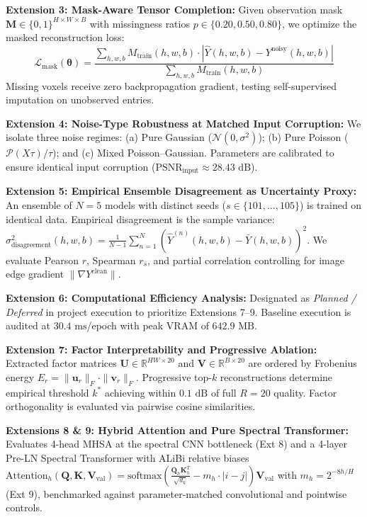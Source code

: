 \textbf{Extension 3: Mask-Aware Tensor Completion:} Given observation mask $\mathbf{M} \in \{0, 1\}^{H \times W \times B}$ with missingness ratios $p \in \{0.20, 0.50, 0.80\}$, we optimize the masked reconstruction loss:
\begin{equation}
\label{eq:masked_loss}
\mathcal{L}_\text{mask}(\boldsymbol{\theta}) = \frac{\sum_{h, w, b} M_\text{train}(h, w, b) \cdot |\hat{Y}(h, w, b) - Y^\text{noisy}(h, w, b)|}{\sum_{h, w, b} M_\text{train}(h, w, b)}
\end{equation}
Missing voxels receive zero backpropagation gradient, testing self-supervised imputation on unobserved entries.

\textbf{Extension 4: Noise-Type Robustness at Matched Input Corruption:} We isolate three noise regimes: (a) Pure Gaussian ($\mathcal{N}(0, \sigma^2)$); (b) Pure Poisson ($\mathcal{P}(X \tau)/\tau$); and (c) Mixed Poisson--Gaussian. Parameters are calibrated to ensure identical input corruption ($\text{PSNR}_\text{input} \approx 28.43\text{ dB}$).

\textbf{Extension 5: Empirical Ensemble Disagreement as Uncertainty Proxy:} An ensemble of $N=5$ models with distinct seeds ($s \in \{101, \dots, 105\}$) is trained on identical data. Empirical disagreement is the sample variance: $\sigma_\text{disagreement}^2(h, w, b) = \frac{1}{N-1} \sum_{n=1}^N (\hat{Y}^{(n)}(h, w, b) - \bar{Y}(h, w, b))^2$. We evaluate Pearson $r$, Spearman $r_s$, and partial correlation controlling for image edge gradient $\|\nabla Y^\text{clean}\|$.

\textbf{Extension 6: Computational Efficiency Analysis:} Designated as \textit{Planned / Deferred} in project execution to prioritize Extensions 7--9. Baseline execution is audited at $30.4\text{ ms}$/epoch with peak VRAM of $642.9\text{ MB}$.

\textbf{Extension 7: Factor Interpretability and Progressive Ablation:} Extracted factor matrices $\mathbf{U} \in \mathbb{R}^{HW \times 20}$ and $\mathbf{V} \in \mathbb{R}^{B \times 20}$ are ordered by Frobenius energy $E_r = \|\mathbf{u}_r\|_F \cdot \|\mathbf{v}_r\|_F$. Progressive top-$k$ reconstructions determine empirical threshold $k^*$ achieving within $0.1\text{ dB}$ of full $R=20$ quality. Factor orthogonality is evaluated via pairwise cosine similarities.

\textbf{Extensions 8 \& 9: Hybrid Attention and Pure Spectral Transformer:} Evaluates 4-head MHSA at the spectral CNN bottleneck (Ext 8) and a 4-layer Pre-LN Spectral Transformer with ALiBi relative biases $\text{Attention}_h(\mathbf{Q}, \mathbf{K}, \mathbf{V}_\text{val}) = \text{softmax}(\frac{\mathbf{Q}_h \mathbf{K}_h^T}{\sqrt{d_k}} - m_h \cdot |i - j|) \mathbf{V}_\text{val}$ with $m_h = 2^{-8h/H}$ (Ext 9), benchmarked against parameter-matched convolutional and pointwise controls.
